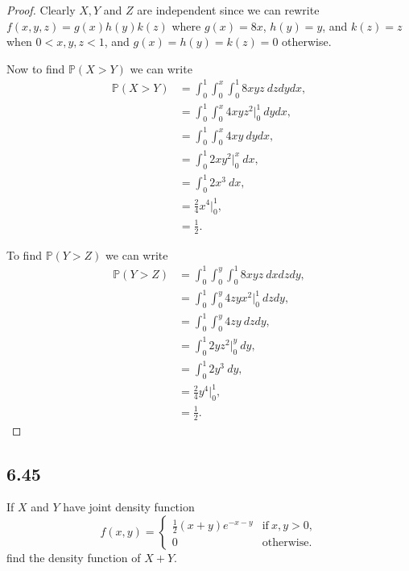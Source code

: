 \documentclass{article}
\renewcommand{\P}[1]{\mathbb{P}(#1)}
\begin{document}
\begin{proof}
    Clearly $X, Y$ and $Z$ are independent since we can rewrite
    $f(x,y,z) = g(x)h(y)k(z)$ where $g(x) = 8x$, $h(y) = y$, and
    $k(z) = z$ when $0 < x,y,z < 1$, and $g(x)=h(y)=k(z) = 0$
    otherwise.

    Now to find $\P{X > Y}$ we can write
    \begin{align*}
        \P{X > Y} & = \int_0^1 \int_0^x \int_0^1 8xyz \ dzdydx,   \\
                  & = \int_0^1 \int_0^x 4xyz^2 \big |_0^1 \ dydx, \\
                  & = \int_0^1 \int_0^x 4xy \ dydx,               \\
                  & = \int_0^1 2xy^2 \big |_0^x \ dx,             \\
                  & = \int_0^1 2x^3 \ dx,                         \\
                  & = \frac{2}{4}x^4 \big |_0^1,                  \\
                  & = \frac{1}{2}.
    \end{align*}

    To find $\P{Y > Z}$ we can write
    \begin{align*}
        \P{Y > Z} & = \int_0^1 \int_0^y \int_0^1 8xyz \ dxdzdy,   \\
                  & = \int_0^1 \int_0^y 4zyx^2 \big |_0^1 \ dzdy, \\
                  & = \int_0^1 \int_0^y 4zy \ dzdy,               \\
                  & = \int_0^1 2yz^2 \big |_0^y \ dy,             \\
                  & = \int_0^1 2y^3 \ dy,                         \\
                  & = \frac{2}{4}y^4 \big |_0^1,                  \\
                  & = \frac{1}{2}.
    \end{align*}
\end{proof}

\subsection*{6.45}
If $X$ and $Y$ have joint density function
\begin{equation*}
    f(x,y) = \begin{cases}
        \frac{1}{2}(x+y)e^{-x-y} & \text{if} \ x,y > 0, \\
        0                        & \text{otherwise}.
    \end{cases}
\end{equation*}
find the density function of $X+Y$.
\end{document}
